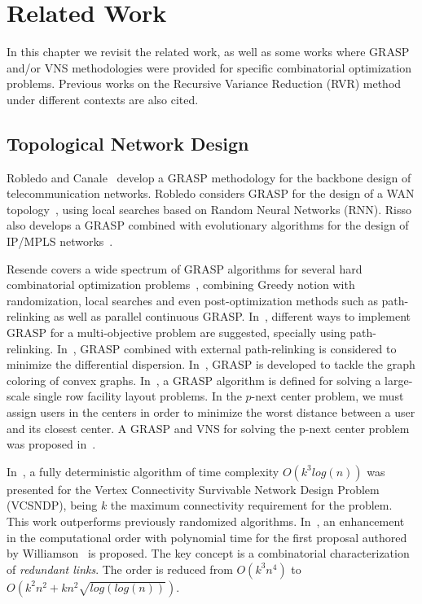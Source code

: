 \chapter{Related Work}\label{related}
In this chapter we revisit the related work, as well as some works where GRASP and/or VNS methodologies 
were provided for specific combinatorial optimization problems. Previous works on the Recursive Variance Reduction (RVR) method under different contexts are also cited.


\section{Topological Network Design}
Robledo and Canale~\cite{29} develop a GRASP methodology for the backbone design of telecommunication networks. 
Robledo considers GRASP for the design of a WAN topology~\cite{11}, using local searches based on 
Random Neural Networks (RNN). Risso also develops a GRASP combined with evolutionary algorithms 
for the design of IP/MPLS networks~\cite{36}.

Resende covers a wide spectrum of GRASP algorithms for several hard combinatorial optimization problems~\cite{51,94}, combining Greedy notion with randomization, local searches and even post-optimization methods such as 
path-relinking as well as parallel continuous GRASP. In~\cite{52}, different ways to implement 
GRASP for a multi-objective problem are suggested, specially using path-relinking. In~\cite{54}, 
GRASP combined with external path-relinking is considered to minimize the differential dispersion. In~\cite{55}, GRASP is developed to tackle the graph coloring of convex graphs. In~\cite{56}, a GRASP algorithm 
is defined for solving a large-scale single row facility layout problems. In the $p$-next center problem, we must assign users in the centers in order to minimize the worst distance between a user and its closest center. 
A GRASP and VNS for solving the p-next center problem was proposed in~\cite{60}.

In~\cite{48}, a fully deterministic algorithm of time complexity $O(k^3log(n))$ was presented 
for the Vertex Connectivity Survivable Network Design Problem (VCSNDP), being $k$ the maximum connectivity requirement for the problem. This work outperforms previously randomized algorithms. 
In~\cite{39}, an enhancement in the computational order with polynomial time 
for the first proposal authored by Williamson~\cite{49} is proposed. The key concept is a combinatorial characterization of \emph{redundant links}. The order is reduced from $O(k^3n^4)$ to $O(k^2n^2+kn^2\sqrt{log(log(n))})$.

